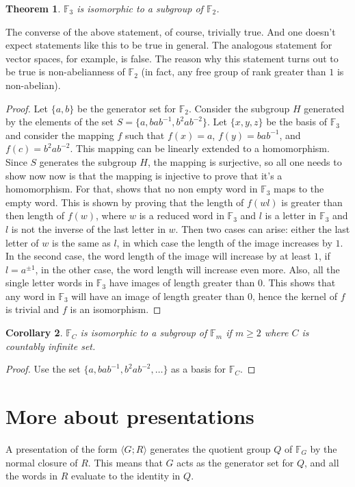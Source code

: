 \documentclass[12pt, titlepage]{article}
\newtheorem{thm}{Theorem}[section]
\newtheorem{cor}[thm]{Corollary}
\theoremstyle{definition}
\begin{document}
\begin{thm}\cite{meier}
$\mathbb{F}_3$ is isomorphic to a subgroup of $\mathbb{F}_2$.
\end{thm}
The converse of the above statement, of course, trivially true. And one doesn't expect statements like this to be true in general. The analogous statement for vector spaces, for example, is false. The reason why this statement turns out to be true is non-abelianness of $\mathbb{F}_2$ (in fact, any free group of rank greater than $1$ is non-abelian).
\begin{proof}
Let $\{a,b\}$ be the generator set for $\mathbb{F}_2$. Consider the subgroup $H$ generated by the elements of the set $S = \{a, bab^{-1}, b^2ab^{-2}\}$. Let $\{x,y,z\}$ be the basis of $\mathbb{F}_3$ and consider the mapping $f$ such that $f(x)=a$, $f(y)=bab^{-1}$, and $f(c) = b^2ab^{-2}$. This mapping can be linearly extended to a homomorphism. Since $S$ generates the subgroup $H$, the mapping is surjective, so all one needs to show now now is that the mapping is injective to prove that it's a homomorphism. For that, shows that no non empty word in $\mathbb{F}_3$ maps to the empty word. This is shown by proving that the length of $f(wl)$ is greater than then length of $f(w)$, where $w$ is a reduced word in $\mathbb{F}_3$ and $l$ is a letter in $\mathbb{F}_3$ and $l$ is not the inverse of the last letter in $w$. Then two cases can arise: either the last letter of $w$ is the same as $l$, in which case the length of the image increases by $1$. In the second case, the word length of the image will increase by at least $1$, if $l=a^{\pm 1}$, in the other case, the word length will increase even more. Also, all the single letter words in $\mathbb{F}_3$ have images of length greater than $0$. This shows that any word in $\mathbb{F}_3$ will have an image of length greater than $0$, hence the kernel of $f$ is trivial and $f$ is an isomorphism.
\end{proof}

\begin{cor}
$\mathbb{F}_C$ is isomorphic to a subgroup of $\mathbb{F}_m$ if $m \geq 2$ where $C$ is countably infinite set.
\end{cor}

\begin{proof}
Use the set $\{a, bab^{-1}, b^2ab^{-2}, \ldots\}$ as a basis for $\mathbb{F}_C$.
\end{proof}

\section{More about presentations}
A presentation of the form $\langle G;R \rangle$ generates the quotient group $Q$ of $\mathbb{F}_G$ by the normal closure of $R$. This means that $G$ acts as the generator set for $Q$, and all the words in $R$ evaluate to the identity in $Q$.
\end{document}
